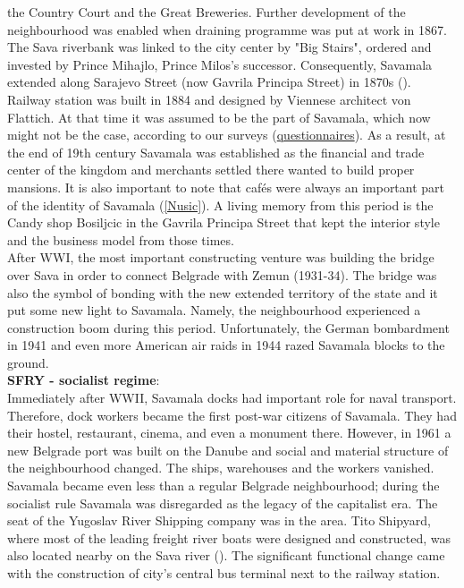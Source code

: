 \documentclass[11pt]{report}
\begin{document}
the Country Court and the Great Breweries.
Further development of the neighbourhood was enabled when draining programme was put at work in 1867.
The Sava riverbank was linked to the city center by "Big Stairs", ordered and invested by Prince Mihajlo, Prince Milos's successor.
Consequently, Savamala extended along Sarajevo Street (now Gavrila Principa Street) in 1870s (\cite{Bureau Savamala}).
Railway station was built in 1884 and designed by Viennese architect von Flattich.
At that time it was assumed to be the part of Savamala, which now might not be the case, according to our surveys (\href{ref}{questionnaires}).
As a result, at the end of 19th century Savamala was established as the financial and trade center of the kingdom and merchants settled there wanted to build proper mansions.
It is also important to note that cafés were always an important part of the identity of Savamala (\ref{Nusic}). A living memory from this period is the Candy shop Bosiljcic in the Gavrila Principa Street that kept the interior style and the business model from those times.
\\
After WWI, the most important constructing venture was building the bridge over Sava in order to connect Belgrade with Zemun (1931-34). The bridge was also the symbol of bonding with the new extended territory of the state and it put some new light to Savamala.
Namely, the neighbourhood experienced a construction boom during this period. Unfortunately, the German bombardment in 1941 and even more American air raids in 1944 razed Savamala blocks to the ground.
\\
\textbf{SFRY - socialist regime}:
\\
Immediately after WWII, Savamala docks had important role for naval transport.
Therefore, dock workers became the first post-war citizens of Savamala. They had their hostel, restaurant, cinema, and even a monument there.
However, in 1961 a new Belgrade port was built on the Danube and social and material structure of the neighbourhood changed.
The ships, warehouses and the workers vanished.
Savamala became even less than a regular Belgrade neighbourhood; during the socialist rule Savamala was disregarded as the legacy of the capitalist era.
The seat of the Yugoslav River Shipping company was in the area.  Tito Shipyard, where most of the leading freight river boats were designed and constructed, was also located nearby on the Sava river (\cite{ref and Kamenzind2}). 
The significant functional change came with the construction of city's central bus terminal next to the railway station.
\end{document}
